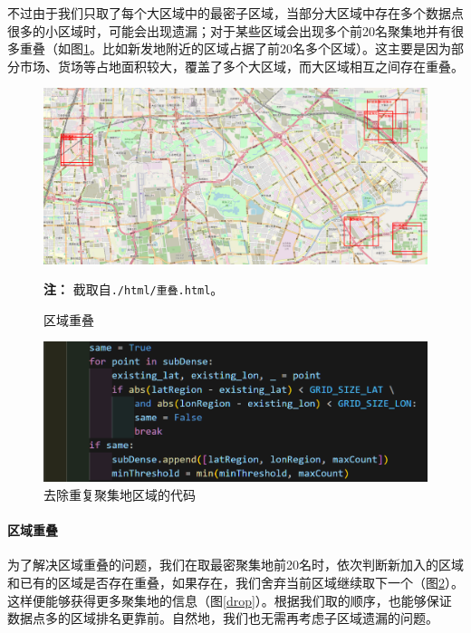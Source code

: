 \documentclass[UTF8]{ctexart}
\begin{document}
不过由于我们只取了每个大区域中的最密子区域，当部分大区域中存在多个数据点很多的小区域时，可能会出现遗漏；对于某些区域会出现多个前20名聚集地并有很多重叠（如图\ref{重叠}。比如新发地附近的区域占据了前20名多个区域）。这主要是因为部分市场、货场等占地面积较大，覆盖了多个大区域，而大区域相互之间存在重叠。

\begin{figure}[!htb]
    \centering
    \begin{minipage}{\textwidth}
        \centering
        \includegraphics[width=\textwidth]{../img/重叠.png}
        \caption{区域重叠}
        \label{重叠}
    \end{minipage}
    \begin{minipage}{\textwidth}
        \footnotesize %
        \textbf{注：} 截取自\texttt{./html/重叠.html}。 %
    \end{minipage}
\end{figure}


\begin{figure}
    \centering
    \includegraphics[width = \textwidth]{../img/去重代码.png}
    \caption{去除重复聚集地区域的代码}
    \label{去重code}
\end{figure}

\paragraph{区域重叠} 为了解决区域重叠的问题，我们在取最密聚集地前20名时，依次判断新加入的区域和已有的区域是否存在重叠，如果存在，我们舍弃当前区域继续取下一个（图\ref{去重code}）。这样便能够获得更多聚集地的信息（图\ref{drop}）。根据我们取的顺序，也能够保证数据点多的区域排名更靠前。自然地，我们也无需再考虑子区域遗漏的问题。
\end{document}

